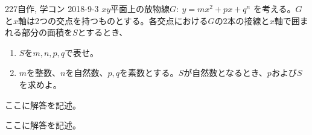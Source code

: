 \begin{prob}{227}{}{自作, 学コン 2018-9-3}
 $xy$平面上の放物線$G:~y=mx^2+px+q^n$ を考える。$G$と$x$軸は2つの交点を持つものとする。各交点における$G$の2本の接線と$x$軸で囲まれる部分の面積を$S$とするとき、
 \begin{enumerate}
  \item $S$を$m, n, p, q$で表せ。
  \item $m$を整数、$n$を自然数、$p, q$を素数とする。$S$が自然数となるとき、$p$および$S$を求めよ。
 \end{enumerate}
\end{prob}
ここに解答を記述。

ここに解答を記述。